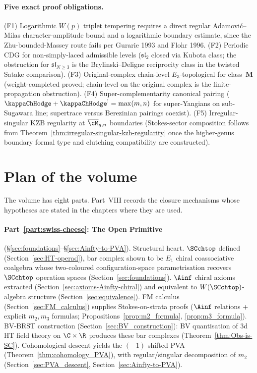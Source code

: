 \paragraph{Five exact proof obligations.}
(F1) Logarithmic $W(p)$ triplet tempering requires a direct
regular Adamovi\'c--Milas character-amplitude bound and a logarithmic
boundary estimate, since the Zhu-bounded-Massey route fails per
Gurarie 1993 and Flohr 1996.
(F2) Periodic CDG for non-simply-laced admissible levels
($\mathfrak{sl}_2$ closed via Kubota class; the obstruction for
$\mathfrak{sl}_{N \ge 3}$ is the Brylinski--Deligne reciprocity
class in the twisted Satake comparison).
(F3) Original-complex chain-level $E_3$-topological for
class~$\mathbf{M}$ (weight-completed proved; chain-level on
the original complex is the finite-propagation obstruction).
(F4) Super-complementarity canonical pairing
($\kappaChHodge + \kappaChHodge^! = \max(m,n)$ for
super-Yangians on sub-Sugawara line; supertrace versus Berezinian
pairings coexist).
(F5) Irregular-singular KZB regularity at $\overline{\cM}_{g,n}$
boundaries (Stokes-sector composition follows from
Theorem~\ref{thm:irregular-singular-kzb-regularity} once the
higher-genus boundary formal type and clutching compatibility are
constructed).

\section*{Plan of the volume}

The volume has eight parts. Part~VIII records the closure mechanisms
whose hypotheses are stated in the chapters where they are used.

\paragraph{Part~\ref{part:swiss-cheese}: The Open Primitive}
(\S\ref{sec:foundations}--\S\ref{sec:Ainfty-to-PVA}).
Structural heart. $\SCchtop$ defined
(Section~\ref{sec:HT-operad}), bar complex shown to be $E_1$
chiral coassociative coalgebra whose two-coloured
configuration-space parametrisation recovers $\SCchtop$
operation spaces (Section~\ref{sec:foundations}). $\Ainf$
chiral axioms extracted (Section~\ref{sec:axioms-Ainfty-chiral})
and equivalent to $W(\SCchtop)$-algebra structure
(Section~\ref{sec:equivalence}). FM calculus
(Section~\ref{sec:FM_calculus}) supplies Stokes-on-strata proofs
($\Ainf$ relations + explicit $m_2, m_3$ formulas;
Propositions~\ref{prop:m2_formula},
\ref{prop:m3_formula}). BV-BRST construction
(Section~\ref{sec:BV_construction}): BV quantisation of 3d HT
field theory on $\C \times \R$ produces these bar complexes
(Theorem~\ref{thm:Obs-is-SC}). Cohomological descent yields the
$(-1)$-shifted PVA (Theorem~\ref{thm:cohomology_PVA}), with
regular/singular decomposition of $m_2$
(Section~\ref{sec:PVA_descent},
Section~\ref{sec:Ainfty-to-PVA}).

